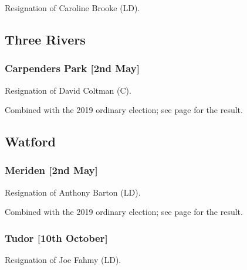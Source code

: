 \documentclass[a4paper,openany]{book}
\begin{document}
\begin{resultsiii}

Resignation of Caroline Brooke (LD).

\subsection*{Three Rivers}

\subsubsection*{Carpenders Park \hspace*{\fill}\nolinebreak[1]%
	\enspace\hspace*{\fill}
	[2nd May]}


Resignation of David Coltman (C).

Combined with the 2019 ordinary election; see page \pageref{CarpendersParkThreeRivers} for the result.

\subsection*{Watford}

\subsubsection*{Meriden \hspace*{\fill}\nolinebreak[1]%
	\enspace\hspace*{\fill}
	[2nd May]}


Resignation of Anthony Barton (LD).

Combined with the 2019 ordinary election; see page \pageref{WatfordMeriden} for the result.

\subsubsection*{Tudor \hspace*{\fill}\nolinebreak[1]%
	\enspace\hspace*{\fill}
	[10th October]}


Resignation of Joe Fahmy (LD).


\end{resultsiii}
\end{document}
